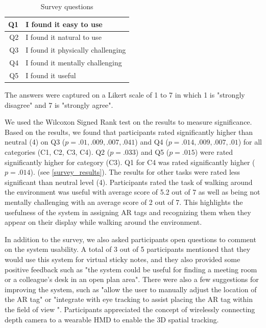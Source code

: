 \begin{table}[ht]
  \centering
	\caption{Survey questions}
    \label{table:questions}
    \begin{tabular}{r l}
    \hline
    Q1 & I found it easy to use \\ \hline
    Q2 & I found it natural to use \\ \hline
    Q3 & I found it physically challenging \\ \hline
    Q4 & I found it mentally challenging \\ \hline
    Q5 & I found it useful \\ \hline
    \end{tabular}
\end{table}

The answers were captured on a Likert scale of 1 to 7 in which 1 is "strongly disagree" and 7 is "strongly agree".

We used the Wilcoxon Signed Rank test on the results to measure significance. Based on the results, we found that participants rated significantly higher than neutral (4) on Q3 ($p=.01, .009, .007, .041$) and Q4 ($p=.014, .009, .007, .01$) for all categories (C1, C2, C3, C4). Q2 ($p=.033$) and Q5 ($p=.015$) were rated significantly higher for category (C3). Q1 for C4 was rated significantly higher ($p=.014$). (see \ref{survey_results}). The results  for other tasks were rated less significant than neutral level (4). Participants rated the task of walking around the environment was useful with average score of 5.2 out of 7 as well as being not mentally challenging with an average score of 2 out of 7. This highlights the usefulness of the system in assigning AR tags and recognizing them when they appear on their display while walking around the environment. 

In addition to the survey, we also asked participants open questions to comment on the system usability. A total of 3 out of 5 participants mentioned that they would use this system for virtual sticky notes, and they also provided some positive feedback such as "the system could be useful for finding a meeting room or a colleague's desk in an open plan area". There were also a few suggestions for improving the system, such as "allow the user to manually adjust the location of the AR tag" or "integrate with eye tracking to assist placing the AR tag within the field of view ". Participants appreciated  the concept of wirelessly connecting depth camera to a wearable HMD to enable the 3D spatial tracking.    


